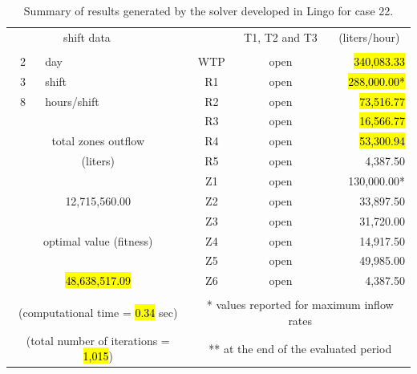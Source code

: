 \documentclass{singlecol}
\theoremstyle{TH}{
\newtheorem{lemma}{Lemma}
\newtheorem{theorem}[lemma]{Theorem}
\newtheorem{corrolary}[lemma]{Corrolary}
\newtheorem{conjecture}[lemma]{Conjecture}
\newtheorem{proposition}[lemma]{Proposition}
\newtheorem{claim}[lemma]{Claim}
\newtheorem{stheorem}[lemma]{Wrong Theorem}
\newtheorem{algorithm}{Algorithm}
}
\theoremstyle{THrm}{
\newtheorem{definition}{Definition}[section]
\newtheorem{question}{Question}[section]
\newtheorem{remark}{Remark}
\newtheorem{scheme}{Scheme}
}
\theoremstyle{THhit}{
\newtheorem{case}{Case}[section]
}
\begin{document}
\begin{table}[t]
\begin{center}
\begin{small}
\begin{tabular}{ c r r r r r }
		\multicolumn{2}{c}{shift data}     &   &      & \multicolumn{1}{c}{T1, T2 and T3}        & \multicolumn{1}{c}{(liters/hour)}  \\
		   \\
		2   &  \multicolumn{1}{l}{day}   &              		& \multicolumn{1}{c}{WTP}    & \multicolumn{1}{c}{open} &  \hl{340,083.33} \\
		3   &  \multicolumn{1}{l}{shift}  &         			& \multicolumn{1}{c}{R1}     & \multicolumn{1}{c}{open} &  \hl{288,000.00*}  \\
		8   &  \multicolumn{1}{l}{hours/shift}        &         & \multicolumn{1}{c}{R2}     & \multicolumn{1}{c}{open} &   \hl{73,516.77}  \\
	   &      &              									& \multicolumn{1}{c}{R3}     & \multicolumn{1}{c}{open} &   \hl{16,566.77}  \\
	   \multicolumn{3}{c}{total zones outflow}                  & \multicolumn{1}{c}{R4}     & \multicolumn{1}{c}{open} &   \hl{53,300.94}  \\
	   \multicolumn{3}{c}{(liters)}              				& \multicolumn{1}{c}{R5}     & \multicolumn{1}{c}{open} &    4,387.50  \\
	   &      &              									& \multicolumn{1}{c}{Z1}     & \multicolumn{1}{c}{open} &  130,000.00* \\
	   \multicolumn{3}{c}{12,715,560.00}              			& \multicolumn{1}{c}{Z2}     & \multicolumn{1}{c}{open} &   33,897.50  \\
	      &              &              						& \multicolumn{1}{c}{Z3}     & \multicolumn{1}{c}{open} &   31,720.00  \\
	   \multicolumn{3}{c}{optimal value (fitness)}              & \multicolumn{1}{c}{Z4}     & \multicolumn{1}{c}{open} &   14,917.50  \\
	   &             &             						 		& \multicolumn{1}{c}{Z5}     & \multicolumn{1}{c}{open} &   49,985.00  \\
	   \multicolumn{3}{c}{\hl{48,638,517.09}}              			& \multicolumn{1}{c}{Z6}     & \multicolumn{1}{c}{open} &    4,387.50  \\
	   \\
	   \multicolumn{3}{c}{(computational time = \hl{0.34} sec)} & \multicolumn{3}{c}{* values reported for maximum inflow rates} \\
	   \multicolumn{3}{c}{(total number of iterations = \hl{1,015})} & \multicolumn{3}{c}{** at the end of the evaluated period} 

	\end{tabular}
\caption{Summary of results generated by the solver developed in Lingo for case 22.}
\label{tab:lingoEvaluationsCase22}
\end{small}
\end{center}
\end{table}
\end{document}
